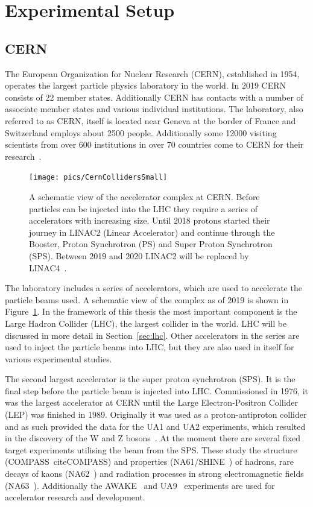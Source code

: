 
\section{Experimental Setup}
\label{sec:exp}
\subsection{CERN}
The European Organization for Nuclear Research (CERN), established in 1954, operates the largest particle physics laboratory in the world. In 2019 CERN consists of 22 member states. Additionally CERN has contacts with a number of associate member states and various individual institutions. The laboratory, also referred to as CERN, itself is located near Geneva at the border of France and Switzerland employs about 2500 people. Additionally some 12000 visiting scientists from over 600 institutions in over 70 countries come to CERN for their research~\cite{CERN}.

\begin{figure}[tb]
\centering
\texttt{[image: pics/CernCollidersSmall]}
\caption[CERN collider complex]{ A schematic view of the accelerator complex at CERN. Before particles can be injected into the LHC they require a series of accelerators with increasing size. Until 2018 protons started their journey in LINAC2 (Linear Accelerator) and continue through the Booster, Proton Synchrotron (PS) and Super Proton Synchrotron (SPS). Between 2019 and 2020 LINAC2 will be replaced by LINAC4~\cite{CernComplex}.}
\label{fig:CernComplex}
\end{figure}

The laboratory includes a series of accelerators, which are used to accelerate the particle beams used. A schematic view of the complex as of 2019 is shown in Figure~\ref{fig:CernComplex}. In the framework of this thesis the most important component is the Large Hadron Collider (LHC), the largest collider in the world. LHC will be discussed in more detail in Section~\ref{sec:lhc}. Other accelerators in the series are used to inject the particle beams into LHC, but they are also used in itself for various experimental studies. 

The second largest accelerator is the super proton synchrotron (SPS). It is the final step before the particle beam is injected into LHC. Commissioned in 1976, it was the largest accelerator at CERN until the Large Electron-Positron Collider (LEP) was finished in 1989. Originally it was used as a proton-antiproton collider and as such provided the data for the UA1 and UA2 experiments, which resulted in the discovery of the W and Z bosons~\cite{Watkins:1986va}. At the moment there are several fixed target experiments utilising the beam from the SPS. These study the structure (COMPASS~cite{COMPASS}) and properties (NA61/SHINE~\cite{Laszlo:2009vg}) of hadrons, rare decays of kaons (NA62~\cite{Hahn:1404985}) and radiation processes in strong electromagnetic fields (NA63~\cite{Mikkelsen:1955391}). Additionally the AWAKE~\cite{Dobert:2669231} and UA9~\cite{Losito:1223625} experiments are used for accelerator research and development. 

